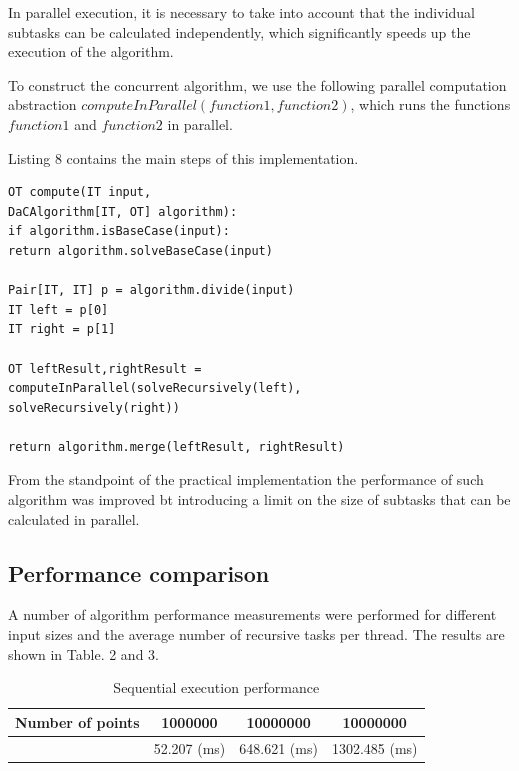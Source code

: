 \documentclass[conference]{IEEEtran}
\theoremstyle{plane}
\begin{document}
In parallel execution, it is necessary to take into account that the individual subtasks can be calculated independently, which significantly speeds up the execution of the algorithm.

To construct the concurrent algorithm, we use the following parallel computation abstraction $computeInParallel(function1, function2)$, which runs the functions $function1$ and $function2$ in parallel.

Listing 8 contains the main steps of this implementation.

\begin{lstlisting}[caption={Parallel execution algorithm},captionpos=b]
OT compute(IT input, 
DaCAlgorithm[IT, OT] algorithm):
if algorithm.isBaseCase(input):
return algorithm.solveBaseCase(input)

Pair[IT, IT] p = algorithm.divide(input)
IT left = p[0]
IT right = p[1]

OT leftResult,rightResult = 
computeInParallel(solveRecursively(left),
solveRecursively(right))

return algorithm.merge(leftResult, rightResult)
\end{lstlisting}

From the standpoint of the practical implementation the performance of such algorithm was improved bt introducing a limit on the size of subtasks that can be calculated in parallel.

\subsection{Performance comparison}

A number of algorithm performance measurements were performed for different input sizes and the average number of recursive tasks per thread. The results are shown in Table. 2 and 3.

\begin{table}[htbp]
	\caption{Sequential execution performance}
	\begin{center}
		\begin{tabular}{|c|c|c|c|}
			\hline
			\textbf{Number of points} & 1000000 & 10000000 & 10000000 \\
			\hline
			&52.207 (ms)&648.621 (ms)&1302.485 (ms)\\
			\hline
		\end{tabular} 
	\end{center}
\end{table} 
\end{document}
